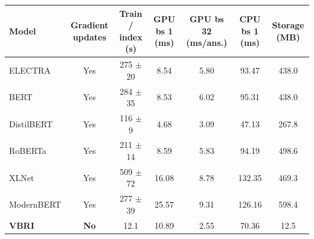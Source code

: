 \begin{tabular}{@{}lcccccc@{}}
\toprule
\textbf{Model} & \textbf{Gradient updates} & \textbf{Train / index (s)} & \textbf{GPU bs 1 (ms)} & \textbf{GPU bs 32 (ms/ans.)} & \textbf{CPU bs 1 (ms)} & \textbf{Storage (MB)} \\
\midrule
ELECTRA & Yes & 275 $\pm$ 20 & 8.54 & 5.80 & 93.47 & 438.0 \\
BERT & Yes & 284 $\pm$ 35 & 8.53 & 6.02 & 95.31 & 438.0 \\
DistilBERT & Yes & 116 $\pm$ 9 & 4.68 & 3.09 & 47.13 & 267.8 \\
RoBERTa & Yes & 211 $\pm$ 14 & 8.59 & 5.83 & 94.19 & 498.6 \\
XLNet & Yes & 509 $\pm$ 72 & 16.08 & 8.78 & 132.35 & 469.3 \\
ModernBERT & Yes & 277 $\pm$ 39 & 25.57 & 9.31 & 126.16 & 598.4 \\
\midrule
\textbf{VBRI} & \textbf{No} & 12.1 & 10.89 & 2.55 & 70.36 & 12.5 \\
\bottomrule
\end{tabular}
